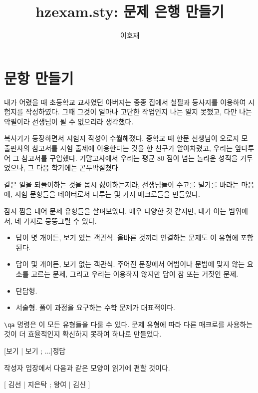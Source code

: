 \documentclass[a4paper]{oblivoir}
\title{hzexam.sty: 문제 은행 만들기}
\author{이호재}
\begin{document}
\maketitle


\section{문항 만들기}

내가 어렸을 때 초등학교 교사였던 아버지는 종종 집에서 철필과 등사지를 이용하여 시험지를 작성하였다. 그때 그것이 얼마나 고단한 작업인지 나는 알지 못했고, 다만 나는 악필이라 선생님이 될 수 없으리라 생각했다.

복사기가 등장하면서 시험지 작성이 수월해졌다. 
중학교 때 한문 선생님이 오로지 모 출판사의 참고서를 시험 출제에 이용한다는 것을 한 친구가 알아차렸고, 우리는 앞다투어 그 참고서를 구입했다.
기말고사에서 우리는 평균 80 점이 넘는 놀라운 성적을 거두었으나, 그 다음 학기에는 곤두박질쳤다.

같은 일을 되풀이하는 것을 몹시 싫어하는지라, 선생님들이 수고를 덜기를 바라는 마음에, 시험 문항들을 데이터로서 다루는 몇 가지 매크로들을 만들었다. 

잠시 짬을 내어 문제 유형들을 살펴보았다. 
매우 다양한 것 같지만, 내가 아는 범위에서, 네 가지로 뭉뚱그릴 수 있다.

\begin{itemize}
\item 답이 몇 개이든, 보기 있는 객관식. 올바른 것끼리 연결하는 문제도 이 유형에 포함된다.
\item 답이 몇 개이든, 보기 없는 객관식. 주어진 문장에서 어법이나 문법에 맞지 않는 요소를 고르는 문제, 그리고 우리는 이용하지 않지만 답이 참 또는 거짓인 문제.
\item 단답형.
\item 서술형. 풀이 과정을 요구하는 수학 문제가 대표적이다.
\end{itemize}

\verb|\qa| 명령은 이 모든 유형들을 다룰 수 있다.
문제 유형에 따라 다른 매크로를 사용하는 것이 더 효율적인지 확신하지 못하여 하나로 만들었다.

\begin{boxedverbatim}
[보기 | 보기 ; ...]{정답}
\end{boxedverbatim}

작성자 입장에서 다음과 같은 모양이 읽기에 편할 것이다.

\begin{boxedverbatim}
[ 
김선 | 
지은탁 ; 
왕여 | 
김신 
]{
}
\end{boxedverbatim}
\end{document}
